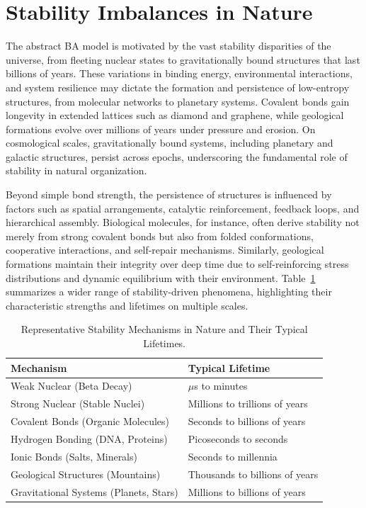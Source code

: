 \documentclass[preprint,12pt]{elsarticle}
\begin{document}

\appendix

\section{Stability Imbalances in Nature}

The abstract BA model is motivated by the vast stability disparities of the universe, from fleeting nuclear states to gravitationally bound structures that last billions of years. These variations in binding energy, environmental interactions, and system resilience may dictate the formation and persistence of low-entropy structures, from molecular networks to planetary systems. Covalent bonds gain longevity in extended lattices such as diamond and graphene, while geological formations evolve over millions of years under pressure and erosion. On cosmological scales, gravitationally bound systems, including planetary and galactic structures, persist across epochs, underscoring the fundamental role of stability in natural organization.

Beyond simple bond strength, the persistence of structures is influenced by factors such as spatial arrangements, catalytic reinforcement, feedback loops, and hierarchical assembly. Biological molecules, for instance, often derive stability not merely from strong covalent bonds but also from folded conformations, cooperative interactions, and self-repair mechanisms. Similarly, geological formations maintain their integrity over deep time due to self-reinforcing stress distributions and dynamic equilibrium with their environment. Table~\ref{tab:binding-forces} summarizes a wider range of stability-driven phenomena, highlighting their characteristic strengths and lifetimes on multiple scales.


\begin{table}
\centering
\caption{Representative Stability Mechanisms in Nature and Their Typical Lifetimes.}
\label{tab:binding-forces}
\begin{tabular}{l l}
\toprule
\textbf{Mechanism} & \textbf{Typical Lifetime} \\
\midrule
Weak Nuclear (Beta Decay) & $\mu$s to minutes \\
Strong Nuclear (Stable Nuclei) & Millions to trillions of years \\
Covalent Bonds (Organic Molecules) & Seconds to billions of years \\
Hydrogen Bonding (DNA, Proteins) & Picoseconds to seconds \\
Ionic Bonds (Salts, Minerals) & Seconds to millennia \\
Geological Structures (Mountains) & Thousands to billions of years \\
Gravitational Systems (Planets, Stars) & Millions to billions of years \\
\bottomrule
\end{tabular}
\end{table}
\end{document}
